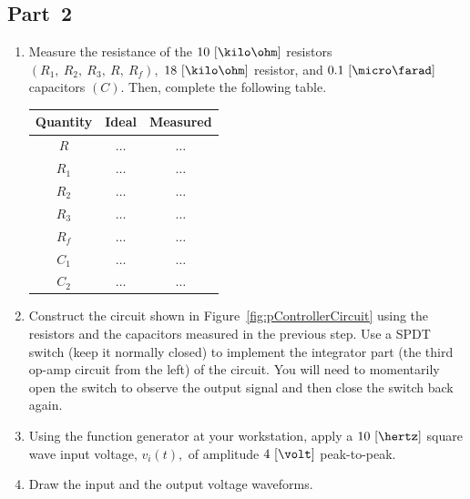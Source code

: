 \subsection{Part~2}   %
\label{sec:part2}
\begin{enumerate}
\item Measure the resistance of the $10~[\kilo\ohm]$ resistors $(R_1,~R_2,~R_3,~R,~R_f),$ $18~[\kilo\ohm]$ resistor,  and $0.1~[\micro\farad]$ capacitors $(C).$ Then, complete the following table.
%
  \begin{center}
    \begin{tabular}{c|c|c}
      \toprule
      Quantity &  Ideal & Measured\\
      \toprule
      $R$ & $\ldots$ & $\ldots$\\   %
      $R_1$ & $\ldots$ & $\ldots$\\   %
      $R_2$ & $\ldots$ & $\ldots$\\   %
      $R_3$ & $\ldots$ & $\ldots$\\   %
      $R_f$ & $\ldots$ & $\ldots$\\   %
      $C_1$ & $\ldots$ & $\ldots$\\   %
      $C_2$ & $\ldots$ & $\ldots$\\   %
      \bottomrule
    \end{tabular}    
  \end{center}
  
\item Construct the circuit shown in Figure~\ref{fig:pControllerCircuit} using the resistors and the capacitors measured in the previous step. Use a SPDT switch (keep it normally closed) to implement the integrator part (the third op-amp circuit from the left) of the circuit.  You will need  to momentarily open the switch to observe the output signal and then close the switch back again.  

\item  Using the function generator at your workstation, apply a $10~[\hertz]$ square wave  input voltage, $v_i(t),$ of amplitude $4~[\volt]$ peak-to-peak. 

\item Draw the input and the output voltage waveforms.
    
  \begin{center}
    \end{center}

   
  \end{enumerate}


